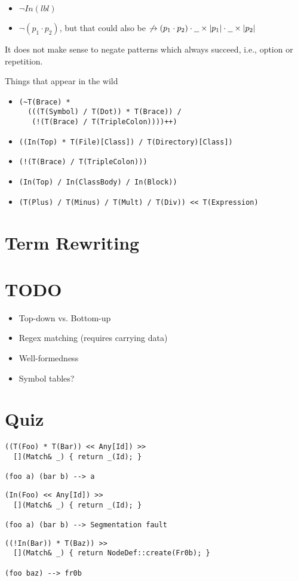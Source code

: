 \documentclass{article}
\newcommand{\lbl}{\ensuremath{\mathit{lbl}}}
\newcommand{\pseq}[2]{\ensuremath{#1 \cdot #2}}
\newcommand{\any}{\ensuremath{\text{\underline{\hspace{0.6em}}}}}
\newcommand{\nfb}[1]{\ensuremath{\not\rightarrow(#1)}}
\newcommand{\pin}[1]{\ensuremath{\mathit{In}(#1)}}
\begin{document}
\begin{itemize}
\item $\lnot \pin{\lbl}$
\item $\lnot (\pseq{p_1}{p_2})$, but that could also be
  $\pseq{\nfb{\pseq{p_1}{p_2}}}{\pseq{\any\times|p_1|}{\any\times|p_2|}}$
\end{itemize}
%
It does not make sense to negate patterns which always succeed,
i.e., option or repetition.

Things that appear in the wild
\begin{itemize}
\item
\begin{verbatim}
(~T(Brace) *
  (((T(Symbol) / T(Dot)) * T(Brace)) /
   (!(T(Brace) / T(TripleColon))))++)
\end{verbatim}
\item \texttt{((In(Top) * T(File)[Class]) / T(Directory)[Class])}
\item \texttt{(!(T(Brace) / T(TripleColon)))}
\item \texttt{(In(Top) / In(ClassBody) / In(Block))}
\item
\begin{verbatim}
(T(Plus) / T(Minus) / T(Mult) / T(Div)) << T(Expression)
\end{verbatim}
\end{itemize}

\section{Term Rewriting}


\section*{TODO}

\begin{itemize}
\item Top-down vs. Bottom-up
\item Regex matching (requires carrying data)
\item Well-formedness
\item Symbol tables?
\end{itemize}

\section*{Quiz}

\begin{verbatim}
((T(Foo) * T(Bar)) << Any[Id]) >>
  [](Match& _) { return _(Id); }

(foo a) (bar b) --> a
\end{verbatim}

\begin{verbatim}
(In(Foo) << Any[Id]) >>
  [](Match& _) { return _(Id); }

(foo a) (bar b) --> Segmentation fault
\end{verbatim}

\begin{verbatim}
((!In(Bar)) * T(Baz)) >>
  [](Match& _) { return NodeDef::create(Fr0b); }

(foo baz) --> fr0b
\end{verbatim}
\end{document}
